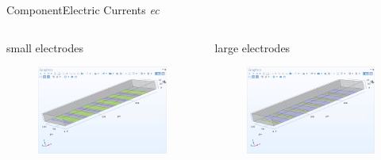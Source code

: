 \documentclass[10pt]{beamer}
\begin{document}
\begin{frame}{Component}{Electric Currents \textit{ec}}
    \begin{columns}[onlytextwidth]
        \begin{column}{0.5\textwidth}
            small electrodes
            \begin{figure}[H]
                \centering
                \includegraphics[width=0.9\columnwidth]{4.png}
            \end{figure}
        \end{column}
        \begin{column}{0.5\textwidth}
            large electrodes
            \begin{figure}[H]
                \centering
                \includegraphics[width=0.9\columnwidth]{5.png}
            \end{figure}
        \end{column}
    \end{columns}
\end{frame}
\end{document}
